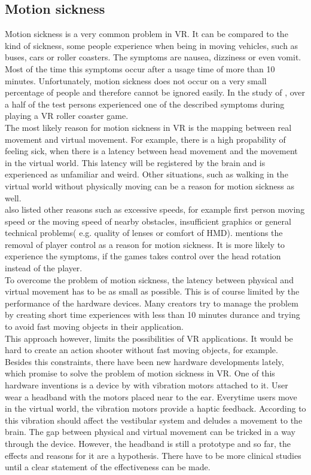 \subsection{Motion sickness}
Motion sickness is a very common problem in VR. It can be compared to the kind of sickness, some people experience when being in moving vehicles, such as buses, cars or roller coasters. The symptoms are nausea, dizziness or even vomit. Most of the time this symptoms occur after a usage time of more than 10 minutes. Unfortunately, motion sickness does not occur on a very small percentage of people and therefore cannot be ignored easily. In the study of \cite{Siess.2017}, over a half of the test persons experienced one of the described symptoms during playing a VR roller coaster game.\\
The most likely reason for motion sickness in VR is the mapping between real movement and virtual movement. For example, there is a high propability of feeling sick, when there is a latency between head movement and the movement in the virtual world. This latency  will be registered by the brain and is experienced as unfamiliar and weird. Other situations, such as walking in the virtual world without physically moving can be a reason for motion sickness as well. \cite{Dorner.2013} \\ \cite{Siess.2017} also listed other reasons such as excessive speeds, for example first person moving speed or the moving speed of nearby obstacles, insufficient graphics or general technical problems( e.g. quality of lenses or comfort of HMD).
\cite{Fenlon.2013} mentions the removal of player control as a reason for motion sickness. It is more likely to experience the symptoms, if the games takes control over the head rotation instead of the player. \\
To overcome the problem of motion sickness, the latency between physical and virtual movement has to be as small as possible. This is of course limited by the performance of the hardware devices. Many creators try to manage the problem by creating short time experiences with less than 10 minutes durance and trying to avoid fast moving objects in their application. \cite{Doerner.2013}\\
This approach however, limits the possibilities of VR applications. It would be hard to create an action shooter without fast moving objects, for example. \\
Besides this constraints, there have been new hardware developments lately, which promise to solve the problem of motion sickness in VR. One of this hardware inventions is a device by \cite{?} with vibration motors attached to it. User wear a headband with the motors placed near to the ear. Everytime users move in the virtual world, the vibration motors provide a haptic feedback. According to \cite{?} this vibration should affect the vestibular system and deludes a movement to the brain. The gap between physical and virtual movement can be tricked in a way through the device. However, the headband is still a prototype and so far, the effects and reasons for it are a hypothesis. There have to be more clinical studies until a clear statement of the effectiveness can be made.

